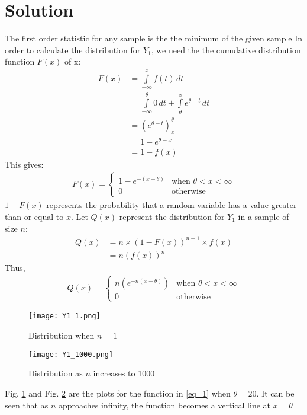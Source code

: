 \documentclass[journal,12pt,twocolumn]{IEEEtran}
\providecommand{\brak}[1]{\ensuremath{\left(#1\right)}}
\theoremstyle{remark}
\numberwithin{equation}{subsection}
\begin{document}
\section{\textbf{Solution}}
The first order statistic for any sample is the the minimum of the given sample 
In order to calculate the distribution for $Y_1$, we need the the cumulative distribution function $F(x)$ of x:\\
\begin{align}
  F(x) &=\displaystyle\int\limits_{-\infty}^{x} f(t) \,dt\\
  &= \displaystyle\int\limits_{-\infty}^{\theta}0\,dt + \displaystyle\int\limits_{\theta}^{x}e^{\theta-t}\,dt\\
  &=\brak{e^{\theta-t}}_{x}^{\theta}\\
  &= 1-e^{\theta-x} \\
  &= 1-f(x)
\end{align}
This gives: 
\begin{align}
    F(x) = 
    \begin{cases}
    1-e^{-(x-\theta)} &\text{when }\theta<x<\infty\\
    0 &\text{otherwise}
    \end{cases}
\end{align}
$1-F(x)$ represents the probability that a random variable has a value greater than or equal to $x$.
Let $Q(x)$ represent the distribution for $Y_1$ in a sample of size $n$:
\begin{align}
    Q(x) &= n\times(1-F(x))^{n-1}\times f(x)\\
    &= n(f(x))^{n}
\end{align}
Thus,
\begin{align}
    Q(x) = \label{eq_1}
    \begin{cases}
    n(e^{-n(x-\theta)})&\text{when }\theta<x<\infty\\
    0 &\text{otherwise }
    \end{cases}
\end{align}

\begin{figure}[h!]
    \centering
    \texttt{[image: Y1\_1.png]}
    \caption{Distribution when $n=1$}
    \label{fig:fig_1}
\end{figure}

\begin{figure}[ht]
    \centering
    \texttt{[image: Y1\_1000.png]}
    \caption{Distribution as $n$ increases to 1000}
    \label{fig:fig_2}
\end{figure}
Fig. \ref{fig:fig_1} and Fig. \ref{fig:fig_2} are the plots for the function in \eqref{eq_1} when $\theta=20$. It can be seen that as $n$ approaches infinity, the function becomes a vertical line at $x=\theta$ \\
\end{document}

